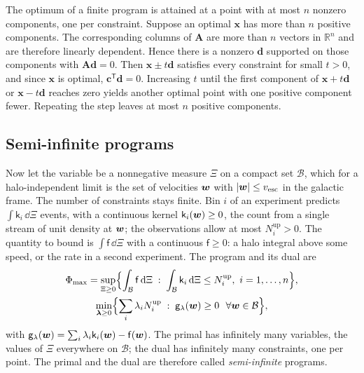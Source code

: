 The optimum of a finite program is attained at a point with at most $n$ nonzero components, one per constraint. Suppose an optimal $\mathbf{x}$ has more than $n$ positive components. The corresponding columns of $\mathbf{A}$ are more than $n$ vectors in $\mathbb{R}^n$ and are therefore linearly dependent. Hence there is a nonzero $\mathbf{d}$ supported on those components with $\mathbf{A}\mathbf{d} = 0$. Then $\mathbf{x} \pm t\mathbf{d}$ satisfies every constraint for small $t > 0$, and since $\mathbf{x}$ is optimal, $\mathbf{c}^{\mathsf{T}}\mathbf{d} = 0$. Increasing $t$ until the first component of $\mathbf{x} + t\mathbf{d}$ or $\mathbf{x} - t\mathbf{d}$ reaches zero yields another optimal point with one positive component fewer. Repeating the step leaves at most $n$ positive components.

\subsection{Semi-infinite programs}

Now let the variable be a nonnegative measure $\Xi$ on a compact set $\mathcal{B}$, which for a halo-independent limit is the set of velocities $\bm{w}$ with $|\bm{w}| \le v_{\mathrm{esc}}$ in the galactic frame. The number of constraints stays finite. Bin $i$ of an experiment predicts $\int\mathsf{k}_i\,\dd\Xi$ events, with a continuous kernel $\mathsf{k}_i(\bm{w}) \ge 0$, the count from a single stream of unit density at $\bm{w}$; the observations allow at most $N_i^{\mathrm{up}} > 0$. The quantity to bound is $\int\mathsf{f}\,\dd\Xi$ with a continuous $\mathsf{f} \ge 0$: a halo integral above some speed, or the rate in a second experiment. The program and its dual are
\begin{gather}
  \Phi_{\max} = \sup_{\Xi \ge 0}\Bigl\{\int_{\mathcal{B}}\mathsf{f}\,\mathrm{d}\Xi \;:\; \int_{\mathcal{B}}\mathsf{k}_i\,\mathrm{d}\Xi \le N_i^{\mathrm{up}},\ i = 1, \dots, n\Bigr\},
  \nonumber\\
  \min_{\boldsymbol{\lambda} \ge 0}\Bigl\{\sum_i\lambda_iN_i^{\mathrm{up}} \;:\; \mathsf{g}_\lambda(\bm{w}) \ge 0\ \ \forall\bm{w} \in \mathcal{B}\Bigr\},
  \label{eq:C.12-sip}
\end{gather}
with $\mathsf{g}_\lambda(\bm{w}) = \sum_i\lambda_i\mathsf{k}_i(\bm{w}) - \mathsf{f}(\bm{w})$. The primal has infinitely many variables, the values of $\Xi$ everywhere on $\mathcal{B}$; the dual has infinitely many constraints, one per point. The primal and the dual are therefore called \emph{semi-infinite} programs.

